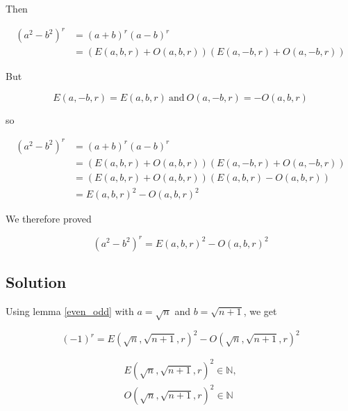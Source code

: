 \noindent Then

\begin{align*}
(a^2 - b^2)^r &= (a + b)^r (a - b)^r \\
&= (E(a, b, r) + O(a, b, r)) (E(a, -b, r) + O(a, -b, r))
\end{align*}

\noindent But

\begin{equation*}
E(a, -b, r) = E(a, b, r) \ \text{and}\  O(a, -b, r) = - O(a, b, r) 
\end{equation*}

\noindent so

\begin{align*}
(a^2 - b^2)^r &= (a + b)^r (a - b)^r \\
&= (E(a, b, r) + O(a, b, r)) (E(a, -b, r) + O(a, -b, r)) \\
&= (E(a, b, r) + O(a, b, r)) (E(a, b, r) - O(a, b, r)) \\
&= E(a, b, r)^2 - O(a, b, r)^2
\end{align*}

\noindent We therefore proved 

\begin{lem}\label{even_odd}
\begin{equation*}
(a^2 - b^2)^r = E(a, b, r)^2 - O(a, b, r)^2
\end{equation*}  
\end{lem}

\subsection{Solution}

Using lemma \ref{even_odd} with $a = \sqrt{n}$ and $b = \sqrt{n + 1}$, we get

\begin{equation}
(-1)^r = E(\sqrt{n}, \sqrt{n + 1}, r)^2 - O(\sqrt{n}, \sqrt{n + 1}, r)^2\tag{L}
\end{equation} 

\begin{lem}\label{squared}
\begin{gather*}
E(\sqrt{n}, \sqrt{n + 1}, r)^2 \in \mathbb{N}, \\
O(\sqrt{n}, \sqrt{n + 1}, r)^2 \in \mathbb{N}
\end{gather*}
\end{lem}
 
